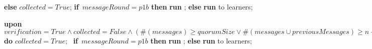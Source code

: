 \documentclass[10pt,pdftex,a4paper]{article}%
\begin{document}
\begin{algorithm}
\begin{algorithmic}[1]
        \State \hspace{\algorithmicindent} \textbf{else}
            \State \hspace{\algorithmicindent}\hspace{\algorithmicindent} $collected = True$;
            \State \hspace{\algorithmicindent}\hspace{\algorithmicindent} \textbf{if}\ $messageRound = p1b$ \textbf{then}
            \State \hspace{\algorithmicindent}\hspace{\algorithmicindent}\hspace{\algorithmicindent} 
            \textbf{run} ;
            \State \hspace{\algorithmicindent}\hspace{\algorithmicindent} \textbf{else}
            \State \hspace{\algorithmicindent}\hspace{\algorithmicindent}\hspace{\algorithmicindent} \textbf{run}  to learners;
            
        
            
    \State
    \State \textbf{upon} $verification = True \land collected = False \land (\#(messages) \geq quorumSize \lor \#(messages \cup previousMessages) \geq n-s)$ \textbf{do}
    \State \hspace{\algorithmicindent} $collected = True$;
    \State\ \hspace{\algorithmicindent}\textbf{if}\ $messageRound = p1b$ \textbf{then}
            \State \hspace{\algorithmicindent}\hspace{\algorithmicindent} 
            \textbf{run} ;
            \State \hspace{\algorithmicindent} \textbf{else}
            \State \hspace{\algorithmicindent}\hspace{\algorithmicindent} \textbf{run}  to learners;

\end{algorithmic}
\end{algorithm}
\end{document}
